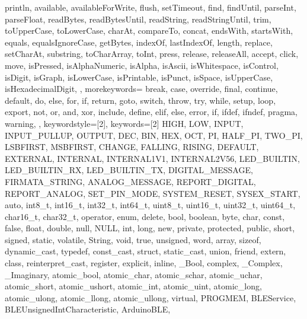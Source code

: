 {{                println, available, availableForWrite, flush, setTimeout, find, 
                findUntil, parseInt, parseFloat, readBytes, readBytesUntil, readString, 
                readStringUntil, trim, toUpperCase, toLowerCase, charAt, compareTo, 
                concat, endsWith, startsWith, equals, equalsIgnoreCase, getBytes, 
                indexOf, lastIndexOf, length, replace, setCharAt, substring, 
                toCharArray, toInt, press, release, releaseAll, accept, click, move, 
                isPressed, isAlphaNumeric, isAlpha, isAscii, isWhitespace, isControl, 
                isDigit, isGraph, isLowerCase, isPrintable, isPunct, isSpace, 
                isUpperCase, isHexadecimalDigit, 
                }, 
  morekeywords={   %
                break, case, override, final, continue, default, do, else, for, 
                if, return, goto, switch, throw, try, while, setup, loop, export, 
                not, or, and, xor, include, define, elif, else, error, if, ifdef, 
                ifndef, pragma, warning,
                }, 
% 
%
  keywordstyle=[2]\color{arduinoBlue},   
  keywords=[2]{   %
                HIGH, LOW, INPUT, INPUT_PULLUP, OUTPUT, DEC, BIN, HEX, OCT, PI, 
                HALF_PI, TWO_PI, LSBFIRST, MSBFIRST, CHANGE, FALLING, RISING, 
                DEFAULT, EXTERNAL, INTERNAL, INTERNAL1V1, INTERNAL2V56, LED_BUILTIN, 
                LED_BUILTIN_RX, LED_BUILTIN_TX, DIGITAL_MESSAGE, FIRMATA_STRING, 
                ANALOG_MESSAGE, REPORT_DIGITAL, REPORT_ANALOG, SET_PIN_MODE, 
                SYSTEM_RESET, SYSEX_START, auto, int8_t, int16_t, int32_t, int64_t, 
                uint8_t, uint16_t, uint32_t, uint64_t, char16_t, char32_t, operator, 
                enum, delete, bool, boolean, byte, char, const, false, float, double, 
                null, NULL, int, long, new, private, protected, public, short, 
                signed, static, volatile, String, void, true, unsigned, word, array, 
                sizeof, dynamic_cast, typedef, const_cast, struct, static_cast, union, 
                friend, extern, class, reinterpret_cast, register, explicit, inline, 
                _Bool, complex, _Complex, _Imaginary, atomic_bool, atomic_char, 
                atomic_schar, atomic_uchar, atomic_short, atomic_ushort, atomic_int, 
                atomic_uint, atomic_long, atomic_ulong, atomic_llong, atomic_ullong, 
                virtual, PROGMEM, BLEService, BLEUnsignedIntCharacteristic, ArduinoBLE,
}}
